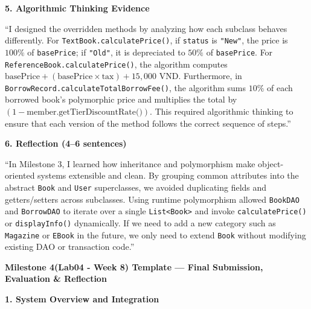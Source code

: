 \documentclass[12pt,a4paper]{article}
\begin{document}
\textbf{5. Algorithmic Thinking Evidence}

``I designed the overridden methods by analyzing how each subclass behaves differently. For \texttt{TextBook.calculatePrice()}, if \texttt{status} is \texttt{"New"}, the price is $100\%$ of \texttt{basePrice}; if \texttt{"Old"}, it is depreciated to $50\%$ of \texttt{basePrice}. For \texttt{ReferenceBook.calculatePrice()}, the algorithm computes $\text{basePrice} + (\text{basePrice} \times \text{tax}) + 15,000\text{ VND}$. Furthermore, in \texttt{BorrowRecord.calculateTotalBorrowFee()}, the algorithm sums $10\%$ of each borrowed book's polymorphic price and multiplies the total by $(1 - \text{member.getTierDiscountRate()})$. This required algorithmic thinking to ensure that each version of the method follows the correct sequence of steps.''

\textbf{6. Reflection (4--6 sentences)}

``In Milestone 3, I learned how inheritance and polymorphism make object-oriented systems extensible and clean. By grouping common attributes into the abstract \texttt{Book} and \texttt{User} superclasses, we avoided duplicating fields and getters/setters across subclasses. Using runtime polymorphism allowed \texttt{BookDAO} and \texttt{BorrowDAO} to iterate over a single \texttt{List<Book>} and invoke \texttt{calculatePrice()} or \texttt{displayInfo()} dynamically. If we need to add a new category such as \texttt{Magazine} or \texttt{EBook} in the future, we only need to extend \texttt{Book} without modifying existing DAO or transaction code.''

\vspace{0.5cm}

{\fontsize{16}{20}\selectfont\bfseries Milestone 4(Lab04 - Week 8) Template --- Final Submission, Evaluation \& Reflection\par}

\hspace{1.2cm}{\itshape\bfseries Document Title: Milestone 4 - File I/O\par}
\hspace{4.8cm}{\itshape\bfseries - Final System Integration \& CT Reflection\par}

\textbf{1. System Overview and Integration}
\end{document}
